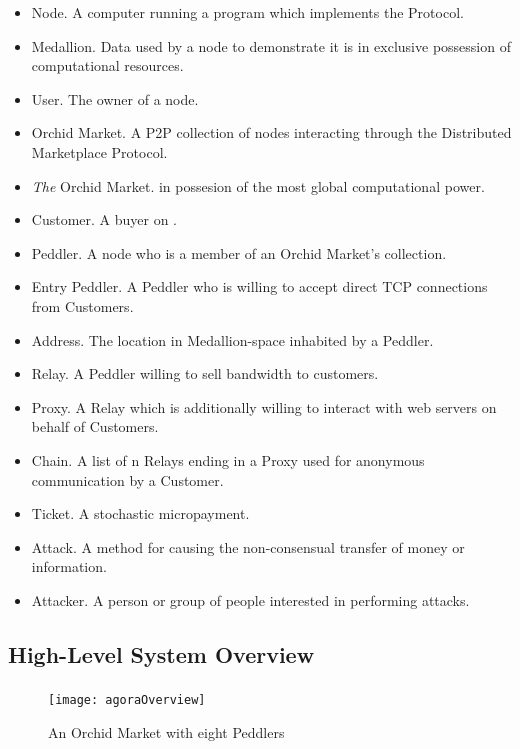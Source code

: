 \begin{itemize}
\item Node. A computer running a program which implements the \Orchid{} Protocol.
\item Medallion. Data used by a node to demonstrate it is in exclusive possession of computational resources.
\item User. The owner of a node.
\item Orchid Market. A P2P collection of nodes interacting through the \Orchid{} Distributed Marketplace Protocol.
\item \emph{The} Orchid Market. \TOM{} in possesion of the most global computational power.
\item Customer. A buyer on \tOM{}.
\item Peddler. A node who is a member of an Orchid Market's collection.
\item Entry Peddler. A Peddler who is willing to accept direct TCP connections from Customers.
\item Address. The location in Medallion-space inhabited by a Peddler.
\item Relay. A Peddler willing to sell bandwidth to customers.
\item Proxy. A Relay which is additionally willing to interact with web servers on behalf of Customers.
\item Chain. A list of n Relays ending in a Proxy used for anonymous communication by a Customer.
\item Ticket. A stochastic micropayment.
\item Attack. A method for causing the non-consensual transfer of money or information.
\item Attacker. A person or group of people interested in performing attacks.
\end{itemize}

\subsection{High-Level System Overview}

\subsubsection{\TOM{}}

\begin{figure}[htbp]
  \centering
  \texttt{[image: agoraOverview]}
  \caption{An Orchid Market with eight Peddlers}
\end{figure}

